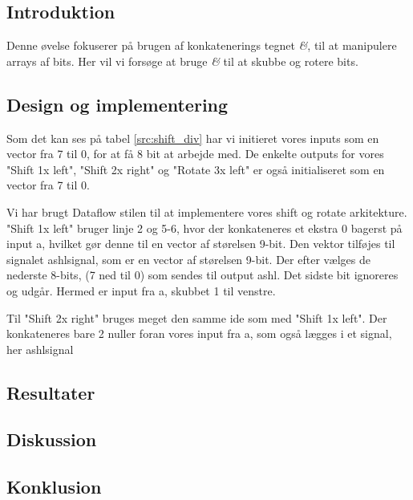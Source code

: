 \documentclass[../journal2.tex]{subfiles}
\begin{document}
\subsection{Introduktion}

Denne øvelse fokuserer på brugen af konkatenerings tegnet \textit{\&}, til at manipulere arrays af bits. Her vil vi forsøge at bruge \textit{\&} til at skubbe og rotere bits.

\subsection{Design og implementering}

Som det kan ses på tabel \ref{src:shift_div} har vi initieret vores inputs som en vector fra 7 til 0, for at få 8 bit at arbejde med. De enkelte outputs for vores "Shift 1x left", "Shift 2x right" og "Rotate 3x left" er også initialiseret som en vector fra 7 til 0.
\begin{table}[!h]
    \centering
      \framebox{
        \rule{8pt}{0pt}
          
  }
  \caption{Entity af shift\textunderscore div}
  \label{src:shift_div}
\end{table}

Vi har brugt Dataflow stilen til at implementere vores shift og rotate arkitekture. "Shift 1x left" bruger linje 2 og 5-6, hvor der konkateneres et ekstra 0 bagerst på input a, hvilket gør denne til en vector af størelsen 9-bit. Den vektor tilføjes til signalet a\textunderscore shl\textunderscore signal, som er en vector af størelsen 9-bit. Der efter vælges de nederste 8-bits, (7 ned til 0) som sendes til output a\textunderscore shl. Det sidste bit ignoreres og udgår. Hermed er input fra a, skubbet 1 til venstre.\par
Til "Shift 2x right" bruges meget den samme ide som med "Shift 1x left". Der konkateneres bare 2 nuller foran vores input fra a, som også lægges i et signal, her a\textunderscore shl\textunderscore signal


\begin{table}[!h]
    \centering
      \framebox{
        \rule{8pt}{0pt}
          
  }
  \caption{Architecture af shift\textunderscore div}
  \label{src:shift_div2}
\end{table}


\subsection{Resultater}

\subsection{Diskussion}

\subsection{Konklusion}
\end{document}
